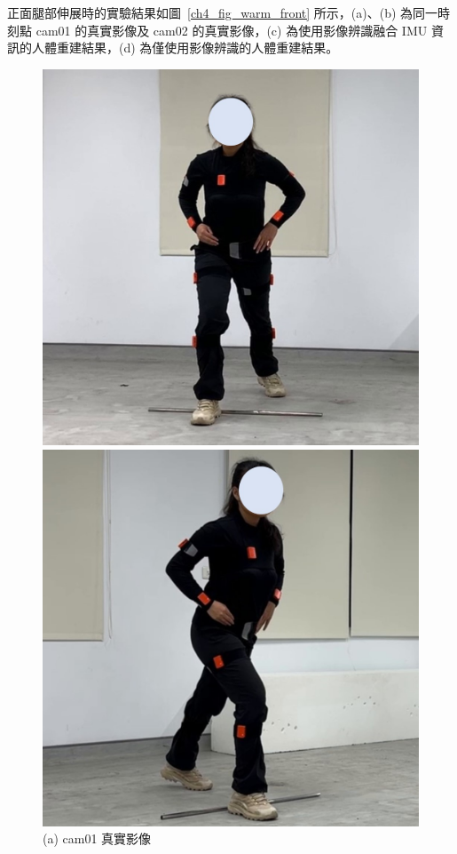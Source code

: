 \clearpage

正面腿部伸展時的實驗結果如圖~\ref{ch4_fig_warm_front} 所示，(a)、(b) 為同一時刻點 cam01 的真實影像及 cam02 的真實影像，(c) 為使用影像辨識融合 IMU 資訊的人體重建結果，(d) 為僅使用影像辨識的人體重建結果。

\begin{figure}[!ht]
   \centering
   \begin{minipage}{.5\textwidth}
      \centering
      \includegraphics[width=.95\linewidth]{figure/ch4_fig_warm_cam01_with3.jpg}
      \caption*{(a) cam01 真實影像}
    \end{minipage}%
    \begin{minipage}{.5\textwidth}
       \centering
       \includegraphics[width=.95\linewidth]{figure/ch4_fig_warm_cam02_with3.jpg}

\end{minipage}
\end{figure}

